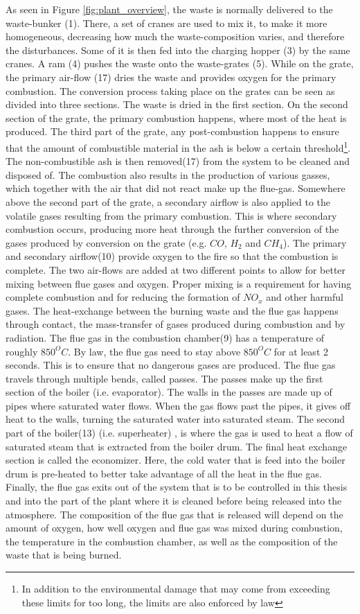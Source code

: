 As seen in Figure \ref{fig:plant_overview}, the waste is normally delivered to the waste-bunker (1). There, a set of cranes are used to mix it, to make it more homogeneous, decreasing how much the waste-composition varies, and therefore the disturbances. Some of it is then fed into the charging hopper (3) by the same cranes. A ram (4) pushes the waste onto the waste-grates (5). While on the grate, the primary air-flow (17) dries the waste and provides oxygen for the primary combustion. The conversion process taking place on the grates can be seen as divided into three sections. The waste is dried in the first section. On the second section of the grate, the primary combustion happens, where most of the heat is produced. The third part of the grate, any post-combustion happens to ensure that the amount of combustible material in the ash is below a certain threshold\footnote{In addition to the environmental damage that may come from exceeding these limits for too long, the limits are also enforced by law}. The non-combustible ash is then removed(17) from the system to be cleaned and disposed of. The combustion also results in the production of various gasses, which together with the air that did not react make up the  flue-gas. Somewhere above the second part of the grate, a secondary airflow is also applied to the volatile gases resulting from the primary combustion. This is where secondary combustion occurs, producing more heat through the further conversion of the gases produced by conversion on the grate (e.g. $CO$, $H_2$ and $CH_4$). The primary and secondary airflow(10) provide oxygen to the fire so that the combustion is complete. The two air-flows are added at two different points to allow for better mixing between flue gases and oxygen. Proper mixing is a requirement for having complete combustion and for reducing the formation of $NO_x$ and other harmful gases. The heat-exchange between the burning waste and the flue gas happens through contact, the mass-transfer of gases produced during combustion and by radiation. The flue gas in the combustion chamber(9) has a temperature of roughly $850^O C$. By law, the flue gas need to stay above $850^O C$ for at least 2 seconds. This is to ensure that no dangerous gases are produced. The flue gas travels through multiple bends, called passes. The passes make up the first section of the boiler (i.e. evaporator). The walls in the passes are made up of pipes where saturated water flows. When the gas flows past the pipes, it gives off heat to the walls, turning the saturated water  into saturated steam.  The second part of the boiler(13) (i.e. superheater) , is where the gas is used to heat a flow of saturated steam that is extracted from the boiler drum.  The final heat exchange section is called the economizer. Here, the cold water that is feed into the boiler drum is pre-heated to better take advantage of all the heat in the flue gas. Finally, the flue gas exits out of the system that is to be controlled in this thesis and into the part of the plant where it is cleaned before being released into the atmosphere. The composition of the flue gas that is released will depend on the amount of oxygen, how well oxygen and flue gas was mixed during combustion, the temperature in the combustion chamber, as well as the composition of the waste that is being burned. 
